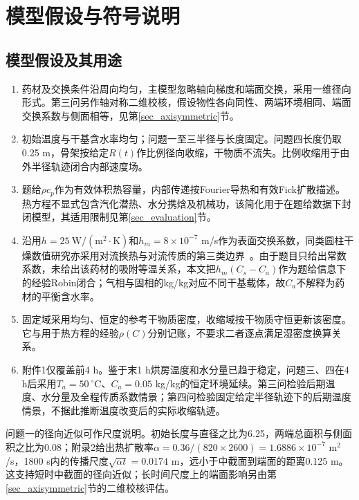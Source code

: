 \section{模型假设与符号说明}
\subsection{模型假设及其用途}
\begin{enumerate}[label=（\arabic*）]
\item 药材及交换条件沿周向均匀，主模型忽略轴向梯度和端面交换，采用一维径向形式。第三问另作轴对称二维校核，假设物性各向同性、两端环境相同、端面交换系数与侧面相等，见第\ref{sec_axisymmetric}节。
\item 初始温度与干基含水率均匀；问题一至三半径与长度固定。问题四长度仍取0.25 m，骨架按给定$R(t)$作比例径向收缩，干物质不流失。比例收缩用于由外半径轨迹闭合内部速度场。
\item 题给$\rho c_p$作为有效体积热容量，内部传递按Fourier导热和有效Fick扩散描述。热方程不显式包含汽化潜热、水分携焓及机械功，该简化用于在题给数据下封闭模型，其适用限制见第\ref{sec_evaluation}节。
\item 沿用$h=25\ \mathrm{W/(m^2\cdot K)}$和$h_m=8\times10^{-7}$ m/s作为表面交换系数，同类圆柱干燥数值研究亦采用对流换热与对流传质的第三类边界~\cite{kaya2007}。由于题目只给出常数系数，未给出该药材的吸附等温关系，本文把$h_m(C_s-C_a)$作为题给信息下的经验Robin闭合；气相与固相的kg/kg对应不同干基载体，故$C_a$不解释为药材的平衡含水率。
\item 固定域采用均匀、恒定的参考干物质密度，收缩域按干物质守恒更新该密度。它与用于热方程的经验$\rho(C)$分别记账，不要求二者逐点满足湿密度换算关系。
\item 附件1仅覆盖前4 h。鉴于末1 h烘房温度和水分量已趋于稳定，问题三、四在4 h后采用$T_a=50\ ^\circ\mathrm C$、$C_a=0.05$ kg/kg的恒定环境延续。第三问检验后期温度、水分量及全程传质系数情景；第四问检验固定给定半径轨迹下的后期温度情景，不据此推断温度改变后的实际收缩轨迹。
\end{enumerate}

问题一的径向近似可作尺度说明。初始长度与直径之比为6.25，两端总面积与侧面积之比为0.08；附录2给出热扩散率$\alpha=0.36/(820\times2600)=1.6886\times10^{-7}$ m$^2$/s，1800 s内的传播尺度$\sqrt{\alpha t}=0.0174$ m，远小于中截面到端面的距离0.125 m。这支持短时中截面的径向近似；长时间尺度上的端面影响另由第\ref{sec_axisymmetric}节的二维校核评估。

